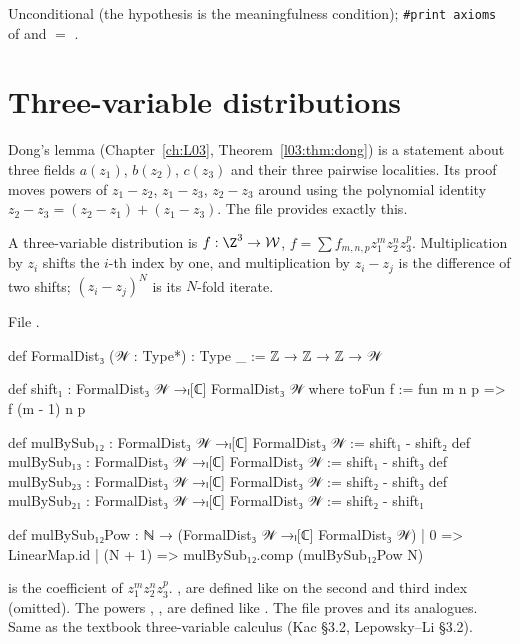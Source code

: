 \begin{status}
Unconditional (the hypothesis is the meaningfulness condition); \texttt{\#print axioms} of
 and  $=$ .
\end{status}

\section{Three-variable distributions}\label{l01:sec:three}

Dong's lemma (Chapter~\ref{ch:L03}, Theorem~\ref{l03:thm:dong}) is a statement about three fields $a(z_1)$, $b(z_2)$,
$c(z_3)$ and their three pairwise localities. Its proof moves powers of $z_1-z_2$, $z_1-z_3$, $z_2-z_3$ around using
the polynomial identity $z_2-z_3 = (z_2-z_1)+(z_1-z_3)$. The file  provides exactly this.

\begin{definition}\label{l01:def:fd3}
A three-variable distribution is $f:\Z^3\to\loneW$, $f = \sum f_{m,n,p}z_1^mz_2^nz_3^p$. Multiplication by $z_i$ shifts the
$i$-th index by one, and multiplication by $z_i-z_j$ is the difference of two shifts; $(z_i-z_j)^N$ is its $N$-fold
iterate.
\end{definition}

\noindent File .
\begin{leancode}
def FormalDist₃ (𝒲 : Type*) : Type _ := ℤ → ℤ → ℤ → 𝒲

def shift₁ : FormalDist₃ 𝒲 →ₗ[ℂ] FormalDist₃ 𝒲 where
  toFun f := fun m n p => f (m - 1) n p

def mulBySub₁₂ : FormalDist₃ 𝒲 →ₗ[ℂ] FormalDist₃ 𝒲 := shift₁ - shift₂
def mulBySub₁₃ : FormalDist₃ 𝒲 →ₗ[ℂ] FormalDist₃ 𝒲 := shift₁ - shift₃
def mulBySub₂₃ : FormalDist₃ 𝒲 →ₗ[ℂ] FormalDist₃ 𝒲 := shift₂ - shift₃
def mulBySub₂₁ : FormalDist₃ 𝒲 →ₗ[ℂ] FormalDist₃ 𝒲 := shift₂ - shift₁

def mulBySub₁₂Pow : ℕ → (FormalDist₃ 𝒲 →ₗ[ℂ] FormalDist₃ 𝒲)
  | 0 => LinearMap.id
  | (N + 1) => mulBySub₁₂.comp (mulBySub₁₂Pow N)
\end{leancode}

\begin{dictionary}
 is the coefficient of $z_1^mz_2^nz_3^p$. ,  are defined like  on the
second and third index (omitted). The powers , ,  are defined
like . The file proves  and
its analogues. Same as the textbook three-variable calculus (Kac §3.2, Lepowsky--Li §3.2).
\end{dictionary}

